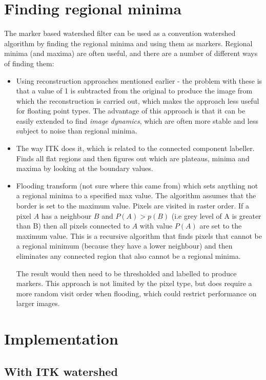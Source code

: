 \documentclass{InsightArticle}
\begin{document}
\section{Finding regional minima}
The marker based watershed filter can be used as a convention
watershed algorithm by finding the regional minima and using them as
markers. Regional minima (and maxima) are often useful, and there are
a number of different ways of finding them:
\begin{itemize}
\item Using reconstruction approaches mentioned earlier - 
the problem with these is that a value of 1 is subtracted from the
original to produce the image from which the reconstruction is carried
out, which makes the approach less useful for floating point
types. The advantage of this approach is that it can be easily
extended to find {\em image dynamics}, which are often more stable and
less subject to noise than regional minima.
\item The way ITK does it, which is related to the connected 
component labeller. Finds all flat regions and then figures out which
are plateaus, minima and maxima by looking at the boundary values.
\item Flooding transform (not sure where this came from) which 
sets anything not a regional minima to a specified max value. The
algorithm assumes that the border is set to the maximum value. Pixels
are visited in raster order. If a pixel $A$ has a neighbour $B$ and
$P(A) > p(B)$ (i.e grey level of A is greater than B) then all pixels
connected to $A$ with value $P(A)$ are set to the maximum value. This
is a recursive algorithm that finds pixels that cannot be a regional
minimum (because they have a lower neighbour) and then eliminates any
connected region that also cannot be a regional minima.

The result would then need to be thresholded and labelled to produce
markers. This approach is not limited by the pixel type, but does
require a more random visit order when flooding, which could restrict
performance on larger images.
\end{itemize}

\section{Implementation}
\label{sect:implementation}

  \subsection{With ITK watershed}
\end{document}
